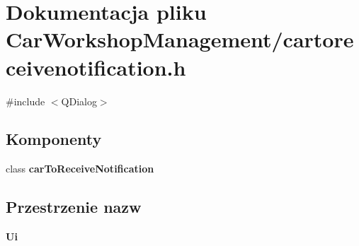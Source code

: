 \section{Dokumentacja pliku Car\+Workshop\+Management/cartoreceivenotification.h}
\label{cartoreceivenotification_8h}
{\ttfamily \#include $<$Q\+Dialog$>$}\newline
\subsection*{Komponenty}
\begin{DoxyCompactItemize}
\item 
class \textbf{ car\+To\+Receive\+Notification}
\end{DoxyCompactItemize}
\subsection*{Przestrzenie nazw}
\begin{DoxyCompactItemize}
\item 
 \textbf{ Ui}
\end{DoxyCompactItemize}
